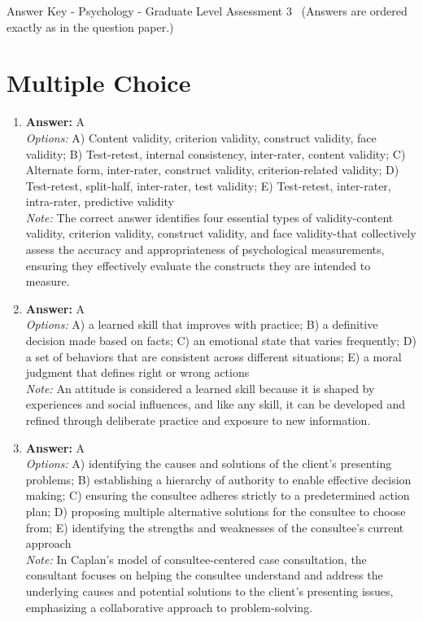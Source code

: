 \documentclass[12pt]{article}
\begin{document}
\begin{center}
Answer Key - Psychology - Graduate Level Assessment 3 \
\small (Answers are ordered exactly as in the question paper.)
\end{center}

\section*{Multiple Choice}
\begin{enumerate}[label=\arabic*.]
\item \textbf{Answer:} A
\\ \textit{Options:} A) Content validity, criterion validity, construct validity, face validity; B) Test-retest, internal consistency, inter-rater, content validity; C) Alternate form, inter-rater, construct validity, criterion-related validity; D) Test-retest, split-half, inter-rater, test validity; E) Test-retest, inter-rater, intra-rater, predictive validity
\\ \textit{Note:} The correct answer identifies four essential types of validity-content validity, criterion validity, construct validity, and face validity-that collectively assess the accuracy and appropriateness of psychological measurements, ensuring they effectively evaluate the constructs they are intended to measure.
\item \textbf{Answer:} A
\\ \textit{Options:} A) a learned skill that improves with practice; B) a definitive decision made based on facts; C) an emotional state that varies frequently; D) a set of behaviors that are consistent across different situations; E) a moral judgment that defines right or wrong actions
\\ \textit{Note:} An attitude is considered a learned skill because it is shaped by experiences and social influences, and like any skill, it can be developed and refined through deliberate practice and exposure to new information.
\item \textbf{Answer:} A
\\ \textit{Options:} A) identifying the causes and solutions of the client's presenting problems; B) establishing a hierarchy of authority to enable effective decision making; C) ensuring the consultee adheres strictly to a predetermined action plan; D) proposing multiple alternative solutions for the consultee to choose from; E) identifying the strengths and weaknesses of the consultee's current approach
\\ \textit{Note:} In Caplan's model of consultee-centered case consultation, the consultant focuses on helping the consultee understand and address the underlying causes and potential solutions to the client's presenting issues, emphasizing a collaborative approach to problem-solving.

\end{enumerate}
\end{document}

